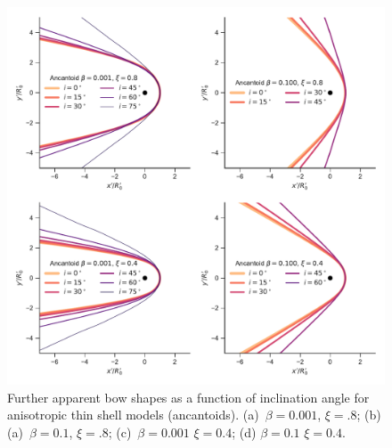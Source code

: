 \begin{figure}
  \centering
  \includegraphics[width=\linewidth]{figs/test_xyprime_ancantoid}
  \caption{Further apparent bow shapes as a function of inclination
    angle for anisotropic thin shell models (ancantoids).
    (a)~\(\beta = 0.001\), \(\xi =.8\); (b) (a)~\(\beta = 0.1\),
    \(\xi =.8\); (c)~\(\beta = 0.001\) \(\xi =0.4\); (d)
    \(\beta = 0.1\) \(\xi =0.4\).}
  \label{fig:xyprime-anacantoid}
\end{figure}


